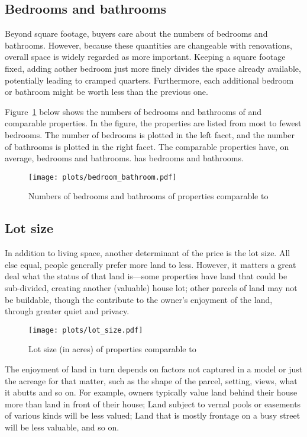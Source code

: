 \documentclass[
12pt, %
letterpaper, %
oneside, %
headinclude,footinclude, %
BCOR5mm, %
]{scrartcl}
\begin{document}
\subsection{Bedrooms and bathrooms}
Beyond square footage, buyers care about the numbers of bedrooms and bathrooms.
However, because these quantities are changeable with renovations, overall space is widely regarded as more important.
Keeping a square footage fixed, adding aother bedroom just more finely divides the space already available, potentially leading to cramped quarters. 
Furthermore, each additional bedroom or bathroom might be worth less than the previous one.

Figure~\ref{fig:bedroom_bathroom} below shows the numbers of bedrooms and bathrooms of \PropertyName{} and comparable properties. 
In the figure, the properties are listed from most to fewest bedrooms.
The number of bedrooms is plotted in the left facet, and the number of bathrooms is plotted in the right facet. 
The comparable properties have, on average, \AverageBedrooms{} bedrooms and \AverageBaths{} bathrooms.
\PropertyName{} has bedrooms \NumberOfBedrooms{} and \NumberOfBaths{} bathrooms.

\begin{figure}[!]
\centering
\caption{Numbers of bedrooms and bathrooms of properties comparable to \PropertyName{}} \label{fig:bedroom_bathroom}  
\texttt{[image: plots/bedroom\_bathroom.pdf]} 
\end{figure}

\subsection{Lot size}
In addition to living space, another determinant of the price is the lot size.
All else equal, people generally prefer more land to less.
However, it matters a great deal what the status of that land is---some properties have land that could be sub-divided, creating another (valuable) house lot;
other parcels of land may not be buildable, though the contribute to the owner's enjoyment of the land, through greater quiet and privacy.

\begin{figure}[!]
\centering
\caption{Lot size (in acres) of properties comparable to \PropertyName{}} \label{fig:lot_size}  
\texttt{[image: plots/lot\_size.pdf]} 
\end{figure}

The enjoyment of land in turn depends on factors not captured in a model or just the acreage for that matter, such as the shape of the parcel, setting, views, what it abutts and so on.
For example, owners typically value land behind their house more than land in front of their house; 
Land subject to vernal pools or easements of various kinds will be less valued;
Land that is mostly frontage on a busy street will be less valuable, and so on.
\end{document}
